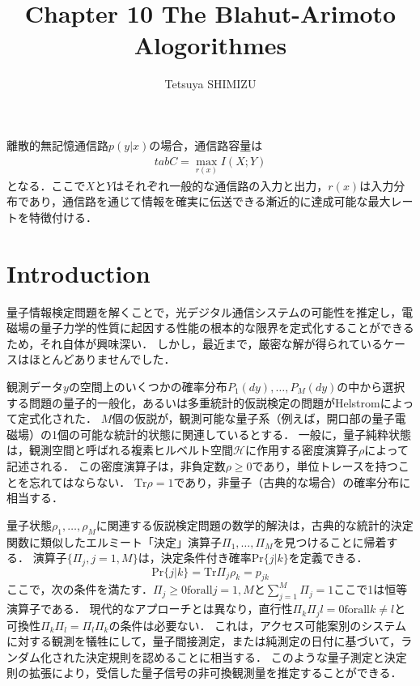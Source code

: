 \documentclass{ltjsarticle}
\begin{document}
\title{Chapter 10 The Blahut-Arimoto Alogorithmes}
\author{Tetsuya SHIMIZU}
\maketitle

離散的無記憶通信路$p(y|x)$の場合，通信路容量は
\begin{eqnarray}
  tab 
  C = \max_{r(x)} I(X;Y)
\end{eqnarray}
となる．ここで$X$と$Y$はそれぞれ一般的な通信路の入力と出力，$r(x)$は入力分布であり，通信路を通じて情報を確実に伝送できる漸近的に達成可能な最大レートを特徴付ける．



\section{Introduction}
量子情報検定問題を解くことで，光デジタル通信システムの可能性を推定し，電磁場の量子力学的性質に起因する性能の根本的な限界を定式化することができるため，それ自体が興味深い．
しかし，最近まで，厳密な解が得られているケースはほとんどありませんでした．

観測データ$y$の空間上のいくつかの確率分布$P_1(dy), \dots, P_M(dy)$の中から選択する問題の量子的一般化，あるいは多重統計的仮説検定の問題がHelstromによって定式化された．
$M$個の仮説が，観測可能な量子系（例えば，開口部の量子電磁場）の1個の可能な統計的状態に関連しているとする．
一般に，量子純粋状態は，観測空間と呼ばれる複素ヒルベルト空間$\mathscr{H}$に作用する密度演算子$\rho$によって記述される．
この密度演算子は，非負定数$\rho \geq 0$であり，単位トレースを持つことを忘れてはならない．
$\mathrm{Tr} \rho = 1$であり，非量子（古典的な場合）の確率分布に相当する．

量子状態$\rho_1, \dots, \rho_M$に関連する仮説検定問題の数学的解決は，古典的な統計的決定関数に類似したエルミート「決定」演算子$\Pi_1, \dots,\Pi_M$を見つけることに帰着する．
演算子$\{ \Pi_j, j = 1, M \}$は，決定条件付き確率$\mathrm{Pr} \{j | k \}$を定義できる．
\begin{equation}
  \mathrm{Pr} \{ j | k\} = \mathrm{Tr} \Pi_j \rho_k = p_{jk}  
\end{equation}
ここで，次の条件を満たす．$\Pi_j \geq 0 \mathrm{for all} j = 1, M$と$\sum_{j=1}^{M} \Pi_j = 1$ここで1は恒等演算子である．
現代的なアプローチとは異なり，直行性$\Pi_k \Pi_jl = 0 \mathrm{for all} k \neq l$と可換性$\Pi_k \Pi_l = \Pi_l \Pi_k$の条件は必要ない．
これは，アクセス可能案別のシステムに対する観測を犠牲にして，量子間接測定，または純測定の日付に基づいて，ランダム化された決定規則を認めることに相当する．
このような量子測定と決定則の拡張により，受信した量子信号の非可換観測量を推定することができる．
\end{document}
